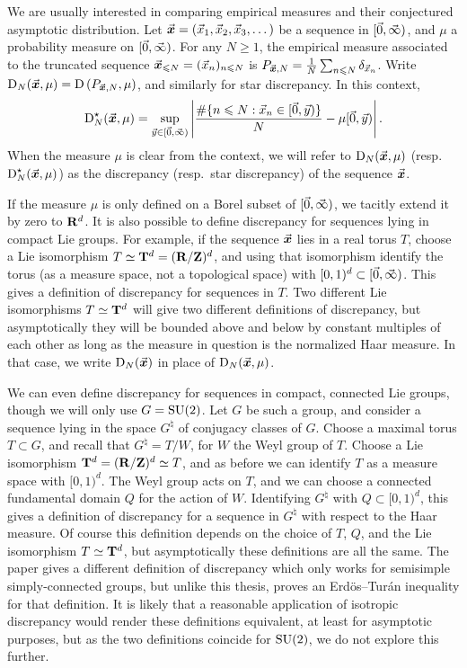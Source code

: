 We are usually interested in comparing empirical measures and their conjectured 
asymptotic distribution. 
Let $\vec{\boldsymbol x} = (\vec{x}_1,\vec{x}_2,\vec{x}_3,\dots)$ be a sequence in 
$[\vec{0},\vec{\infty})$, and $\mu$ a probability measure on $[\vec{0},\vec{\infty})$. For any 
$N\geqslant 1$, the empirical measure associated to the truncated 
sequence $\vec{\boldsymbol x}_{\leqslant N} = (\vec{x}_n)_{n\leqslant N}$ is 
$P_{\vec{\boldsymbol x},N} = \frac{1}{N} \sum_{n\leqslant N} \delta_{\vec{x}_n}$. Write 
$\operatorname{D}_N(\vec{\boldsymbol x},\mu) = \operatorname{D}\left( P_{\vec{\boldsymbol x},N},\mu\right)$, and similarly for star 
discrepancy. In this context, 
\[
	\operatorname{D}^\star_N(\vec{\boldsymbol x},\mu) = \sup_{\vec{y}\in [\vec{0},\vec{\infty})} \left| \frac{\# \{n\leqslant N : \vec{x}_n \in [\vec{0},\vec{y})\}}{N} - \mu[\vec{0},\vec{y})\right| .
\]
When the measure $\mu$ is clear from the context, we will refer to 
$\operatorname{D}_N(\vec{\boldsymbol x},\mu)$ (resp.~$\operatorname{D}_N^\star(\vec{\boldsymbol x},\mu)$) as the discrepancy (resp.~star 
discrepancy) of the sequence $\vec{\boldsymbol x}$.

If the measure $\mu$ is only defined on a Borel subset of $[\vec{0},\vec{\infty})$, we 
tacitly extend it by zero to $\mathbf{R}^d$. It is also possible to define discrepancy 
for sequences lying in compact Lie groups. For example, if the sequence $\vec{\boldsymbol x}$ 
lies in a real torus $T$, choose a Lie isomorphism $T\simeq \mathbf{T}^d = (\mathbf{R}/\mathbf{Z})^d$, 
and using that isomorphism identify the torus (as a measure space, not a 
topological space) with 
$[0,1)^d\subset [\vec{0},\vec{\infty})$. 
This gives a definition of discrepancy for sequences in $T$. Two different 
Lie isomorphisms $T\simeq \mathbf{T}^d$ will give two different definitions of 
discrepancy, but asymptotically they will be bounded above and below by 
constant multiples of each other as long as the measure in question is the 
normalized Haar measure. In that case, we write $\operatorname{D}_N(\vec{\boldsymbol x})$ in place of 
$\operatorname{D}_N(\vec{\boldsymbol x}, \mu)$. 

We can even define discrepancy for sequences in compact, connected Lie groups, 
though we will only use $G = \operatorname{SU}(2)$. Let $G$ be such a group, and consider a 
sequence lying in the space $G^\natural$ of conjugacy classes of $G$. Choose a 
maximal torus $T\subset G$, and recall that 
$G^\natural = T/W$, for $W$ the Weyl group of $T$. Choose a Lie isomorphism 
$\mathbf{T}^d = (\mathbf{R}/\mathbf{Z})^d \simeq T$, and as before we can identify $T$ as a measure 
space with 
$[0,1)^d$. The Weyl group acts on $T$, and we can choose a connected fundamental 
domain $Q$ for the action of $W$. Identifying 
$G^\natural$ with $Q\subset [0,1)^d$, this gives a definition of discrepancy for 
a sequence in $G^\natural$ with respect to the Haar measure. Of course this 
definition depends on the choice of $T$, $Q$, and the Lie isomorphism 
$T\simeq \mathbf{T}^d$, but 
asymptotically these definitions are all the same. The paper 
\cite{rosengarten-2013} gives a different definition of discrepancy which only 
works for semisimple simply-connected groups, but unlike this thesis, proves an 
Erd\"os--Tur\'an inequality for that definition. It is likely that a reasonable 
application of isotropic discrepancy would render these definitions equivalent, 
at least for asymptotic purposes, but as the two definitions coincide for 
$\operatorname{SU}(2)$, we do not explore this further. 


